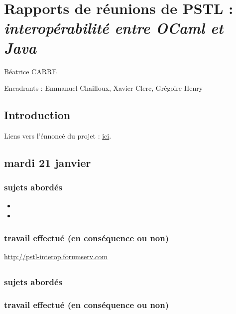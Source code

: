 \documentclass[a4paper, 11pt]{report}
\begin{document}
\chapter{Rapports de réunions de PSTL : \emph{interopérabilité entre OCaml et Java}}

Béatrice CARRE

Encadrants : Emmanuel Chailloux, Xavier Clerc, Grégoire Henry

\section*{Introduction}
Liens vers l'énnoncé du projet : \href{https://www-master.ufr-info-p6.jussieu.fr/2013/interoperabilite-entre-OCaml-et}{ici}.

\section{mardi 21 janvier}
\subsection{sujets abordés}

\begin{itemize}
\item 
\item
\end{itemize}

\subsection{travail effectué (en conséquence ou non)}
\url{http://pstl-interop.forumserv.com}

 \section{}
\subsection{sujets abordés}


\subsection{travail effectué (en conséquence ou non)}
\end{document}
